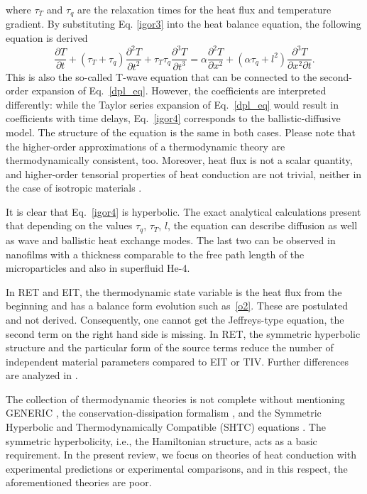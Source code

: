 \documentclass[sn-mathphys]{sn-jnl}%
\theoremstyle{thmstyleone}%
\theoremstyle{thmstyletwo}%
\theoremstyle{thmstylethree}%
\begin{document}
{\begin{equation}
\end{equation}
where $\tau_T$ and $\tau_q$ are the relaxation times for the heat flux and temperature gradient. By substituting Eq. \eqref{igor3} into the heat balance equation, the following equation is derived
\begin{equation}
	\label{igor4}
	\frac{\partial T}{\partial t}+(\tau_T+\tau_q)\frac{\partial^2 T}{\partial t^2}+\tau_T\tau_q \frac{\partial^3 T}{\partial t^3}=\alpha\frac{\partial^2 T}{\partial x^2}+(\alpha\tau_q+l^2)\frac{\partial^3 T}{\partial x^2 \partial t}.
\end{equation}
This is also the so-called T-wave equation that can be connected to the second-order expansion of Eq.~\eqref{dpl_eq}. However, the coefficients are interpreted differently: while the Taylor series expansion of Eq.~\eqref{dpl_eq} would result in coefficients with time delays, Eq.~\eqref{igor4} corresponds to the ballistic-diffusive model. The structure of the equation is the same in both cases. Please note that the higher-order approximations of a thermodynamic theory are thermodynamically consistent, too. Moreover, heat flux is not a scalar quantity, and higher-order tensorial properties of heat conduction are not trivial, neither in the case of isotropic materials \cite{FamEta21a}.


It is clear that Eq.~\eqref{igor4} is hyperbolic. The exact analytical calculations present that depending on the values $\tau_q$, $\tau_T$, $l$, the equation can describe diffusion as well as wave and ballistic heat exchange modes. The last two can be observed in nanofilms with a thickness comparable to the free path length of the microparticles and also in superfluid He-4.

In RET and EIT, the thermodynamic state variable is the heat flux from the beginning and has a balance form evolution such as~\eqref{o2}. These are postulated and not derived. Consequently, one cannot get the Jeffreys-type equation, the second term on the right hand side is missing. In RET, the symmetric hyperbolic structure and the particular form of the source terms reduce the number of independent material parameters compared to EIT or TIV. Further differences are analyzed in \cite{CimEta14a,Jou20a,KovEta20a}.


The collection of thermodynamic theories is not complete without mentioning GENERIC \cite{Ott05b}, the conservation-dissipation formalism \cite{Yon20a}, and the Symmetric Hyperbolic and Thermodynamically Compatible (SHTC) equations \cite{RomEta20a}. The symmetric hyperbolicity, i.e., the Hamiltonian structure, acts as a basic requirement. In the present review, we {focus on} theories of heat conduction with experimental predictions or experimental comparisons, and in this respect, the aforementioned theories are poor.

}
\end{document}
